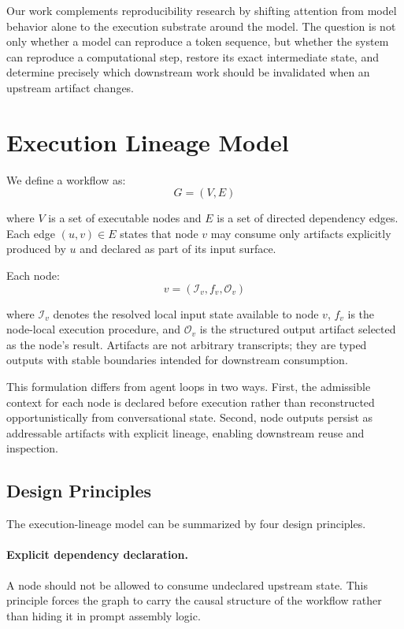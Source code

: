 \documentclass{article}
\begin{document}
Our work complements reproducibility research by shifting attention from model behavior alone to the execution substrate around the model. The question is not only whether a model can reproduce a token sequence, but whether the system can reproduce a computational step, restore its exact intermediate state, and determine precisely which downstream work should be invalidated when an upstream artifact changes.

\section{Execution Lineage Model}

We define a workflow as:
\begin{equation}
G = (V, E)
\end{equation}

where $V$ is a set of executable nodes and $E$ is a set of directed dependency edges. Each edge $(u, v) \in E$ states that node $v$ may consume only artifacts explicitly produced by $u$ and declared as part of its input surface.

Each node:
\begin{equation}
v = (\mathcal{I}_v, f_v, \mathcal{O}_v)
\end{equation}

where $\mathcal{I}_v$ denotes the resolved local input state available to node $v$, $f_v$ is the node-local execution procedure, and $\mathcal{O}_v$ is the structured output artifact selected as the node's result. Artifacts are not arbitrary transcripts; they are typed outputs with stable boundaries intended for downstream consumption.

This formulation differs from agent loops in two ways. First, the admissible context for each node is declared before execution rather than reconstructed opportunistically from conversational state. Second, node outputs persist as addressable artifacts with explicit lineage, enabling downstream reuse and inspection.

\subsection{Design Principles}

The execution-lineage model can be summarized by four design principles.

\paragraph{Explicit dependency declaration.}
A node should not be allowed to consume undeclared upstream state. This principle forces the graph to carry the causal structure of the workflow rather than hiding it in prompt assembly logic.
\end{document}
